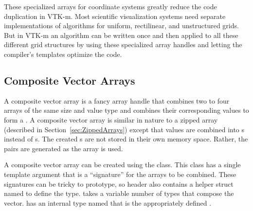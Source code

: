 

\begin{didyouknow}
  These specialized arrays for coordinate systems greatly reduce the code
  duplication in VTK-m. Most scientific visualization systems need separate
  implementations of algorithms for uniform, rectilinear, and unstructured
  grids. But in VTK-m an algorithm can be written once and then applied to
  all these different grid structures by using these specialized array
  handles and letting the compiler's templates optimize the code.
\end{didyouknow}

\subsection{Composite Vector Arrays}
\label{sec:CompositeVectorArrays}


A composite vector array is a fancy array handle that combines two to four
arrays of the same size and value type and combines their corresponding
values to form a . A composite vector array is similar in nature
to a zipped array (described in Section~\ref{sec:ZippedArrays}) except that
values are combined into s instead of s. The created
s are not stored in their own memory space. Rather, the pairs are
generated as the array is used.

A composite vector array can be created using the
 class. This class has a single
template argument that is a ``signature'' for the arrays to be combined.
These signatures can be tricky to prototype, so
 header also contains a
helper struct named  to define the
type.  takes a variable
number of  types that compose the vector.
 has an internal type named
 that is the appropriately defined
.

